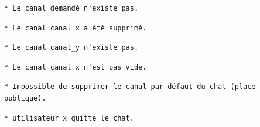 \medskip
\begin{lstlisting}[caption={\normalsize{Message de non existence d'un canal demandé {\footnotesize(pour changement de canal)}}},label={sec:ihm:message:canalchangementimpossible}]
* Le canal demandé n'existe pas.
\end{lstlisting}

\medskip
\begin{lstlisting}[caption={\normalsize{Exemple de message de suppression d'un canal.}},label={sec:ihm:message:canalsuppression}]
* Le canal canal_x a été supprimé.
\end{lstlisting}

\medskip
\begin{lstlisting}[caption={\normalsize{Exemple de message de suppression impossible d'un canal {\footnotesize(le canal n'existe pas).}}},label={sec:ihm:message:suppressionexistence}]
* Le canal canal_y n'existe pas.
\end{lstlisting}

\medskip
\begin{lstlisting}[caption={\normalsize{Exemple de message de suppression impossible d'un canal {\footnotesize(le canal n'est pas vide).}}},label={sec:ihm:message:canalsuppressionnonvide}]
* Le canal canal_x n'est pas vide.
\end{lstlisting}

\medskip
\begin{lstlisting}[caption={\normalsize{Message de suppression impossible du canal \og place publique \fg.}},label={sec:ihm:message:suppressionplacepublique}]
* Impossible de supprimer le canal par défaut du chat (place publique).
\end{lstlisting}

\medskip
\begin{lstlisting}[caption={\normalsize{Exemple de message de départ d'un utilisateur du chat.}},label={sec:ihm:message:departchat}]
* utilisateur_x quitte le chat.
\end{lstlisting}

